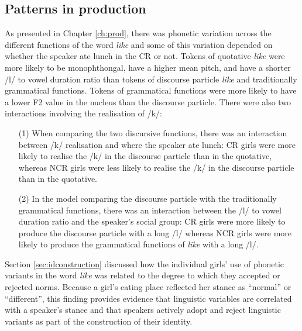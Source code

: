 \subsection{Patterns in production}
 

As presented in Chapter \ref{ch:prod}, there was phonetic variation across the different functions of the word \textit{like} and some of this variation depended on whether the speaker ate lunch in the CR or not.  Tokens of quotative \textit{like} were more likely to be monophthongal, have a higher mean pitch, and have a shorter /l/ to vowel duration ratio than tokens of discourse particle \textit{like} and traditionally grammatical functions.  Tokens of grammatical functions were more likely to have a lower F2 value in the nucleus than the discourse particle.  There were also two interactions involving the realisation of /k/: 
\begin{enumerate}
	\item[(1)] When comparing the two discursive functions, there was an interaction between /k/ realisation and where the speaker ate lunch: CR girls were more likely to realise the /k/ in the discourse particle than in the quotative, whereas NCR girls were less likely to realise the /k/ in the discourse particle than in the quotative.  

	\item[(2)] In the model comparing the discourse particle with the traditionally grammatical functions, there was an interaction between the /l/ to vowel duration ratio and the speaker's social group: CR girls were more likely to produce the discourse particle with a long /l/ whereas NCR girls were more likely to produce the grammatical functions of \textit{like} with a long /l/.

\end{enumerate}
  

\noindent Section \ref{sec:idconstruction} discussed how the individual girls' use of phonetic variants in the word \textit{like} was related to the degree to which they accepted or rejected norms.  Because a girl's eating place reflected her stance as ``normal'' or ``different'', this finding provides evidence that linguistic variables are correlated with a speaker's stance and that speakers actively adopt and reject linguistic variants as part of the construction of their identity.


